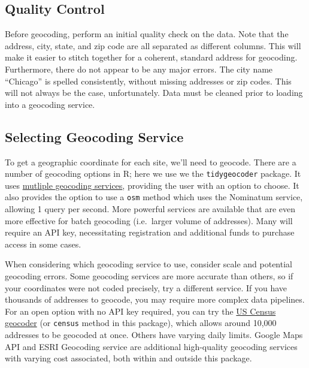 \documentclass[
  letterpaper,
  DIV=11,
  numbers=noendperiod]{scrreprt}
\begin{document}
\subsection{Quality Control}\label{quality-control}

Before geocoding, perform an initial quality check on the data. Note
that the address, city, state, and zip code are all separated as
different columns. This will make it easier to stitch together for a
coherent, standard address for geocoding. Furthermore, there do not
appear to be any major errors. The city name ``Chicago'' is spelled
consistently, without missing addresses or zip codes. This will not
always be the case, unfortunately. Data must be cleaned prior to loading
into a geocoding service.

\subsection{Selecting Geocoding
Service}\label{selecting-geocoding-service}

To get a geographic coordinate for each site, we'll need to geocode.
There are a number of geocoding options in R; here we use we the
\texttt{tidygeocoder} package. It uses
\href{https://jessecambon.github.io/tidygeocoder/articles/geocoder_services.html}{mutliple
geocoding services}, providing the user with an option to choose. It
also provides the option to use a \texttt{osm} method which uses the
Nominatum service, allowing 1 query per second. More powerful services
are available that are even more effective for batch geocoding
(i.e.~larger volume of addresses). Many will require an API key,
necessitating registration and additional funds to purchase access in
some cases.

When considering which geocoding service to use, consider scale and
potential geocoding errors. Some geocoding services are more accurate
than others, so if your coordinates were not coded precisely, try a
different service. If you have thousands of addresses to geocode, you
may require more complex data pipelines. For an open option with no API
key required, you can try the
\href{https://geocoding.geo.census.gov/}{US Census geocoder} (or
\texttt{census} method in this package), which allows around 10,000
addresses to be geocoded at once. Others have varying daily limits.
Google Maps API and ESRI Geocoding service are additional high-quality
geocoding services with varying cost associated, both within and outside
this package.
\end{document}
